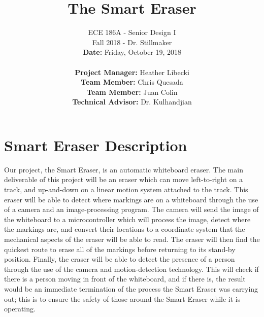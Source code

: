 \documentclass[10pt,onecolumn,draftcls]{IEEEtran} 					%
\title{\vspace{2in}The Smart Eraser}	%
\author{ECE 186A - Senior Design I \\ 			%
	Fall 2018 - Dr. Stillmaker \\ 				%
	\vspace{12pt} 								%
	\textbf{Date:} Friday, October 19, 2018  \\ 
	\vspace{2in}								%
	\vspace{6pt}
\begin{flushleft}
	\textbf{Project Manager:} Heather Libecki			%
	\vspace{12pt}
	\underline{\hspace{3in}}\\					%
	\textbf{Team Member:} Chris Quesada
	\vspace{12pt}
	\underline{\hspace{3in}}\\
	\textbf{Team Member:} Juan Colin
	\vspace{12pt}
	\underline{\hspace{3in}}\\
	\textbf{Technical Advisor:} Dr. Kulhandjian
	\underline{\hspace{3in}} \\
	\end{flushleft}
	\vspace{12in}}								%
\begin{document}
	\thispagestyle{empty}						%
	
	\maketitle									%
	
	
	\section{Smart Eraser Description}
	\setlength{\parindent}{5ex}
	Our project, the Smart Eraser, is an automatic whiteboard eraser. The main deliverable of this project will be an eraser which can move left-to-right on a track, and up-and-down on a linear motion system attached to the track. This eraser will be able to detect where markings are on a whiteboard through the use of a camera and an image-processing program. The camera will send the image of the whiteboard to a microcontroller which will process the image, detect where the markings are, and convert their locations to a coordinate system that the mechanical aspects of the eraser will be able to read. The eraser will then find the quickest route to erase all of the markings before returning to its stand-by position. Finally, the eraser will be able to detect the presence of a person through the use of the camera and motion-detection technology. This will check if there is a person moving in front of the whiteboard, and if there is, the result would be an immediate termination of the process the Smart Eraser was carrying out; this is to ensure the safety of those around the Smart Eraser while it is operating. 
	
\end{document}
